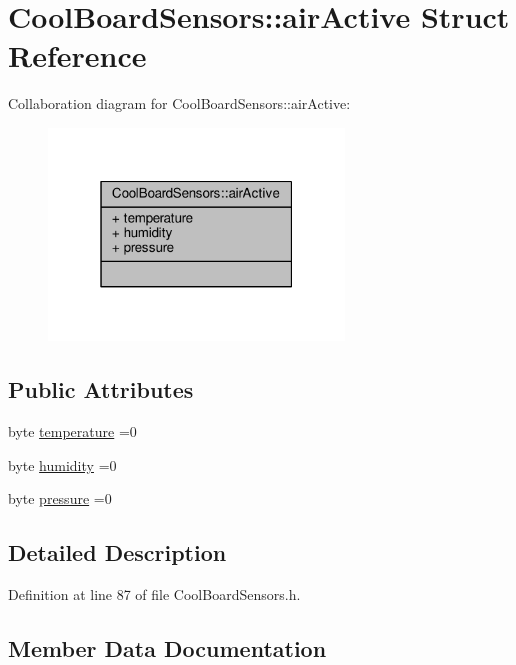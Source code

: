 \hypertarget{structCoolBoardSensors_1_1airActive}{}\section{Cool\+Board\+Sensors\+:\+:air\+Active Struct Reference}
\label{structCoolBoardSensors_1_1airActive}


Collaboration diagram for Cool\+Board\+Sensors\+:\+:air\+Active\+:\nopagebreak
\begin{figure}[H]
\begin{center}
\leavevmode
\includegraphics[width=223pt]{structCoolBoardSensors_1_1airActive__coll__graph}
\end{center}
\end{figure}
\subsection*{Public Attributes}
\begin{DoxyCompactItemize}
\item 
byte \hyperlink{structCoolBoardSensors_1_1airActive_a9a6633c426b0508e30ebc1832ec6d745}{temperature} =0
\item 
byte \hyperlink{structCoolBoardSensors_1_1airActive_ae5740445054b27415e22f450576accb7}{humidity} =0
\item 
byte \hyperlink{structCoolBoardSensors_1_1airActive_ab200826a70d1dc9945f5efb6b9c732ed}{pressure} =0
\end{DoxyCompactItemize}


\subsection{Detailed Description}


Definition at line 87 of file Cool\+Board\+Sensors.\+h.



\subsection{Member Data Documentation}
\mbox{\label{structCoolBoardSensors_1_1airActive_ae5740445054b27415e22f450576accb7}} 
